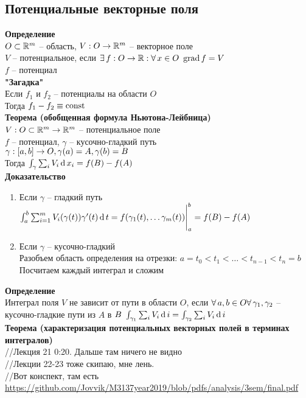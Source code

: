 \documentclass[12pt]{article}
\DeclareMathOperator{\grad}{grad}
\begin{document}
\subsection{Потенциальные векторные поля}
\textbf{Определение}\\
$O \subset \mathbb{R}^m$ -- область, $V: O \rightarrow \mathbb{R}^m$ -- векторное поле\\
$V$ -- потенциальное, если $\ex f: O \rto \Rset: \fall x \in O\ \grad f = V$\\
$f$ -- потенциал\\
\textbf{"Загадка"}\\
Если $f_1$ и $f_2$ -- потенциалы на области $O$\\
Тогда $f_1 - f_2 \equiv \operatorname{const}$\\
\textbf{Теорема (обобщенная формула Ньютона-Лейбница)}\\
$V: O \subset \mathbb{R}^m \rightarrow \mathbb{R}^m$ -- потенциальное поле\\
$f$ -- потенциал, $\gamma$ -- кусочно-гладкий путь\\
$\gamma:[a,b]\rightarrow O, \gamma(a) = A, \gamma(b) = B$\\
Тогда $\int_\gamma \sum_i V_i\operatorname{d} x_i = f(B) - f(A)$\\
\textbf{Доказательство}
\begin{enumerate}
    \item Если $\gamma$ -- гладкий путь\\
    $\int_a^b \sum_{i=1}^m V_i(\gamma(t))\gamma'(t) \operatorname{d} t = f(\gamma_1(t), \ldots \gamma_m(t))\Biggr|_a^b = f(B) - f(A)$
    \item Если $\gamma$ -- кусочно-гладкий\\
    Разобъем область определения на отрезки: $a=t_0 < t_1 < \ldots < t_{n-1} < t_n = b$\\
    Посчитаем каждый интеграл и сложим
\end{enumerate}
\textbf{Определение}\\
Интеграл поля $V$ не зависит от пути в области $O$, если $\forall\, a,b \in O \forall\, \gamma_1, \gamma_2$ -- кусочно-гладкие пути из $A$ в $B\ \int_{\gamma_1} \sum_i V_i\operatorname{d} i = \int_{\gamma_2} \sum_i V_i\operatorname{d} i$\\
\textbf{Теорема (характеризация потенциальных векторных полей в терминах интегралов)}\\
//Лекция 21 0:20. Дальше там ничего не видно\\
//Лекции 22-23 тоже скипаю, мне лень. \\
//Вот конспект, там есть \url{https://github.com/Jovvik/M3137year2019/blob/pdfs/analysis/3sem/final.pdf}
\end{document}
